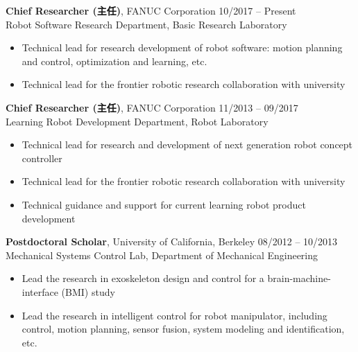 \documentclass[UTF8,nofonts]{res}
\begin{document}
\begin{resume}
\begin{list}{}{\setlength\leftmargin{0in}\setlength\topsep{0.15in}}
\item {\bf Chief Researcher (主任)}, FANUC Corporation \hfill 10/2017 -- Present\\
Robot Software Research Department, Basic Research Laboratory
\begin{itemize}
	\item Technical lead for research development of robot software: motion planning and control, optimization and learning, etc.
	\item Technical lead for the frontier robotic research collaboration with university
\end{itemize}

\item {\bf Chief Researcher (主任)}, FANUC Corporation \hfill 11/2013 -- 09/2017\\
Learning Robot Development Department, Robot Laboratory
\begin{itemize}
	\item Technical lead for research and development of next generation robot concept controller
	\item Technical lead for the frontier robotic research collaboration with university
	\item Technical guidance and support for current learning robot product development
\end{itemize}

\item    {\bf Postdoctoral Scholar}, University of California, Berkeley    \hfill 08/2012 -- 10/2013\\
Mechanical Systems Control Lab, Department of Mechanical Engineering
\begin{itemize}
	\item Lead the research in exoskeleton design and control for a brain-machine-interface (BMI) study
	\item Lead the research in intelligent control for robot manipulator, including control, motion planning, sensor fusion, system modeling and identification, etc.
\end{itemize}




\end{list}
\end{resume}
\end{document}
